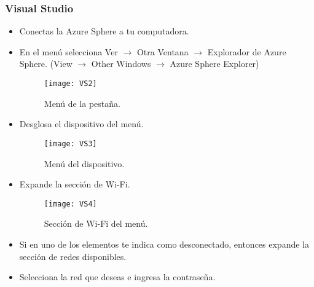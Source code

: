 \subsubsection{Visual Studio}
\begin{itemize}
	\item
	Conectas la Azure Sphere a tu computadora.
	\item 
	En el menú selecciona Ver $\rightarrow$ Otra Ventana $\rightarrow$ Explorador de Azure Sphere.
	(View $\rightarrow$ Other Windows $\rightarrow$ Azure Sphere Explorer)
	
	\begin{figure}[h]
		\centering
		\texttt{[image: VS2]}
		\caption{Menú de la pestaña.}
	\end{figure}

	\pagebreak
	\item 
	Desglosa el dispositivo del menú. 
	\begin{figure}[h]
		\centering
		\texttt{[image: VS3]}
		\caption{Menú del dispositivo.}
	\end{figure}

	\pagebreak
	\item 
	Expande la sección de Wi-Fi.

	\begin{figure}[h]
		\centering
		\texttt{[image: VS4]}
		\caption{Sección de Wi-Fi del menú.}
	\end{figure}

	\item 
	Si en uno de los elementos te indica como desconectado, entonces expande la sección de redes disponibles.
	\item 
	Selecciona la red que deseas e ingresa la contraseña.
\end{itemize}
\pagebreak
